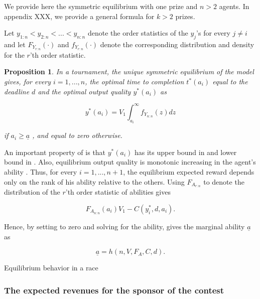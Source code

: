 \documentclass[12pt,]{article}
\newtheorem{proposition}{Proposition}
\begin{document}
We provide here the symmetric equilibrium with one prize and \(n>2\)
agents. In appendix XXX, we provide a general formula for \(k>2\)
prizes.

Let \(y_{1:n} < y_{2:n} < ... < y_{n:n}\) denote the order statistics of
the \(y_j\)'s for every \(j\neq i\) and let \({F_{Y_{r:n}}}(\cdot)\) and
\({f_{Y_{r:n}}}(\cdot)\) denote the corresponding distribution and
density for the \(r\)'th order statistic.

\begin{proposition}

In a tournament, the unique symmetric equilibrium of the model gives,
for every \(i=1, ..., n\), the optimal time to completion \(t^*(a_i)\)
equal to the deadline \(d\) and the optimal output quality \(y^*(a_i)\)
as

\[\label{eq: optimal bid tournament}
  y^*(a_i) =  V_1 \int_{a_i}^\infty {f_{Y_{n:n}}} (z) dz\]

if \({a_i}\geq {\underline a}\) \citep[see][]{moldovanu2001optimal}, and
equal to zero otherwise.

\end{proposition}

An important property of is that \(y^*(a_i)\) has its upper bound in and
lower bound in . Also, equilibrium output quality is monotonic
increasing in the agent's ability \citep[see][]{moldovanu2001optimal}.
Thus, for every \(i=1, ..., n+1\), the equilibrium expected reward
depends only on the rank of his ability relative to the others. Using
\({F_{A_{r:n}}}\) to denote the distribution of the \(r\)'th order
statistic of abilities gives

\[\label{eq: expected payoffs tournament}
  {F_{A_{n:n}}}(a_i) V_1  - C(y_i^*, d, a_i).\]

Hence, by setting to zero and solving for the ability, gives the
marginal ability \({\underline a}\) as

\[{\underline a}= h(n, V, F_A, C, d).\]

\begin{corollary}

Equilibrium behavior in a race

\end{corollary}

\subsubsection{The expected revenues for the sponsor of the
contest}\label{the-expected-revenues-for-the-sponsor-of-the-contest}
\end{document}

